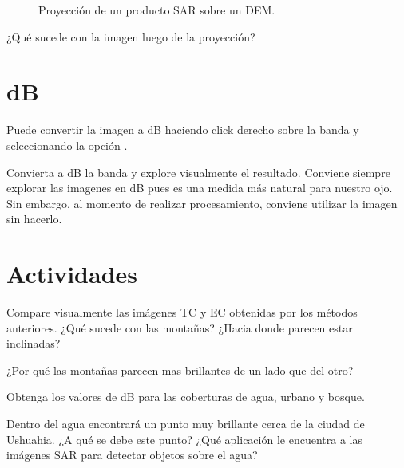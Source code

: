 \begin{figure}[h!]
    \centering
    \hfill
    \caption{Proyección de un producto SAR sobre un DEM.}
    \label{fig:gtc}
\end{figure}

\begin{que}
    ¿Qué sucede con la imagen luego de la proyección?
\end{que}

\section{dB}

Puede convertir la imagen a dB haciendo click derecho sobre la banda y seleccionando la opción .

Convierta a dB la banda  y explore visualmente el resultado. Conviene siempre explorar las imagenes en dB pues es una medida más natural para nuestro ojo. Sin embargo, al momento de realizar procesamiento, conviene utilizar la imagen sin hacerlo. %

\section{Actividades}

\begin{que}
    Compare visualmente las imágenes TC y EC obtenidas por los métodos anteriores. ¿Qué sucede con las montañas? ¿Hacia donde parecen estar inclinadas?
\end{que}

\begin{que}
    ¿Por qué las montañas parecen mas brillantes de un lado que del otro?
\end{que}

\begin{que}
    Obtenga los valores de dB para las coberturas de agua, urbano y bosque.
\end{que}

\begin{que}
    Dentro del agua encontrará un punto muy brillante cerca de la ciudad de Ushuahia. ¿A qué se debe este punto? ¿Qué aplicación le encuentra a las imágenes SAR para detectar objetos sobre el agua?
\end{que}
